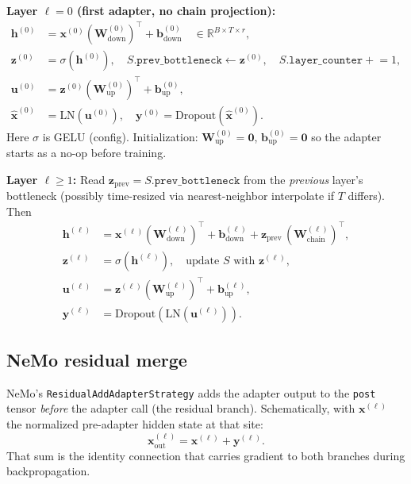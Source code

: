 \documentclass[11pt,a4paper]{article}
\begin{document}
\noindent\textbf{Layer $\ell=0$ (first adapter, no chain projection):}
\begin{align}
  \bm{h}^{(0)} &= \bm{x}^{(0)} (\bm{W}_\text{down}^{(0)})^\top + \bm{b}_\text{down}^{(0)} \quad\in \mathbb{R}^{B\times T\times r}, \\
  \bm{z}^{(0)} &= \sigma\!\left(\bm{h}^{(0)}\right), \quad
  S.\texttt{prev\_bottleneck} \gets \bm{z}^{(0)},\quad S.\texttt{layer\_counter}\mathrel{+}=1, \\
  \bm{u}^{(0)} &= \bm{z}^{(0)} (\bm{W}_\text{up}^{(0)})^\top + \bm{b}_\text{up}^{(0)}, \\
  \hat{\bm{x}}^{(0)} &= \text{LN}(\bm{u}^{(0)}), \quad
  \bm{y}^{(0)} = \text{Dropout}(\hat{\bm{x}}^{(0)}).
\end{align}
Here $\sigma$ is GELU (config). Initialization: $\bm{W}_\text{up}^{(0)}=\bm{0}$, $\bm{b}_\text{up}^{(0)}=\bm{0}$ so the adapter starts as a no-op before training.

\noindent\textbf{Layer $\ell \ge 1$:}
Read $\bm{z}_\text{prev} = S.\texttt{prev\_bottleneck}$ from the \emph{previous} layer's bottleneck (possibly time-resized via nearest-neighbor interpolate if $T$ differs). Then
\begin{align}
  \bm{h}^{(\ell)} &= \bm{x}^{(\ell)} (\bm{W}_\text{down}^{(\ell)})^\top + \bm{b}_\text{down}^{(\ell)}
    + \bm{z}_\text{prev}\, (\bm{W}_\text{chain}^{(\ell)})^\top, \\
  \bm{z}^{(\ell)} &= \sigma\!\left(\bm{h}^{(\ell)}\right), \quad
  \text{update } S \text{ with } \bm{z}^{(\ell)}, \\
  \bm{u}^{(\ell)} &= \bm{z}^{(\ell)} (\bm{W}_\text{up}^{(\ell)})^\top + \bm{b}_\text{up}^{(\ell)}, \\
  \bm{y}^{(\ell)} &= \text{Dropout}\!\left(\text{LN}(\bm{u}^{(\ell)})\right).
\end{align}

\subsection{NeMo residual merge}
NeMo's \texttt{ResidualAddAdapterStrategy} adds the adapter output to the \texttt{post} tensor \emph{before} the adapter call (the residual branch). Schematically, with $\bm{x}^{(\ell)}$ the normalized pre-adapter hidden state at that site:
\[
  \bm{x}^{(\ell)}_\text{out} = \bm{x}^{(\ell)} + \bm{y}^{(\ell)}.
\]
That sum is the identity connection that carries gradient to both branches during backpropagation.

\end{document}

